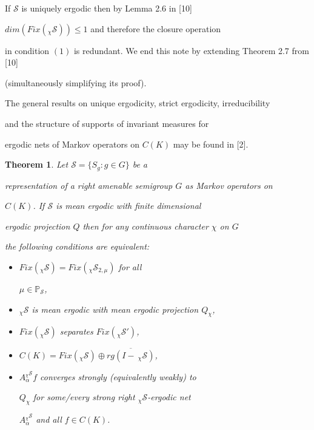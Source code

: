 \documentclass{amsart}
\newtheorem{thm}{Theorem}[section]
\theoremstyle{definition}
\theoremstyle{remark}
\numberwithin{equation}{section}
\newcommand{\bs}{\rightline{$\blacksquare$}}
\begin{document}
\bs



If $\mathcal{S}$ is uniquely ergodic then by Lemma 2.6 in [10]

$dim (Fix(_{\chi}\mathcal{S})) \leq 1 $ and therefore the closure operation

in condition $(1)$ is redundant. We end this note by extending Theorem 2.7 from [10]

(simultaneously simplifying its proof).

The general results on  unique ergodicity, strict ergodicity, irreducibility

and the structure of supports of invariant measures for

ergodic nets of Markov operators on $C(K)$ may be found in [2].



\begin{thm}

Let $\mathcal{S} = \{ S_g : g\in G \}$ be a

representation of a right amenable semigroup $G$ as Markov operators on

$C(K)$. If $\mathcal{S}$ is mean ergodic with finite dimensional

ergodic projection $Q$ then for any continuous character $\chi $ on $G$

the following conditions are equivalent:

\begin{itemize}

\item[(1)] $Fix(_{\chi}\mathcal{S}) = Fix(_{\chi}\mathcal{S}_{2,\mu})$ for all

$\mu \in \mathbb{P}_{\mathcal{S}}$,

\item[(2)] $_{\chi}\mathcal{S}$ is mean ergodic with mean ergodic projection $Q_{\chi}$,

\item[(3)] $Fix(\mathcal{_{\chi}S})$ separates $Fix(_{\chi}\mathcal{S}')$,

\item[(3)] $C(K) = Fix(_{\chi}\mathcal{S})\oplus \overline{rg(I - \  _{\chi}\mathcal{S})} $,

\item[(4)] $A_{\alpha}^{_{\chi}\mathcal{S}}f$ converges strongly (equivalently weakly) to

$Q_{\chi }$ for some/every strong right $_{\chi}\mathcal{S}$-ergodic net

$A_{\alpha}^{_{\chi}\mathcal{S}}$ and all $f\in C(K)$.

\end{itemize}

\end{thm}
\end{document}
